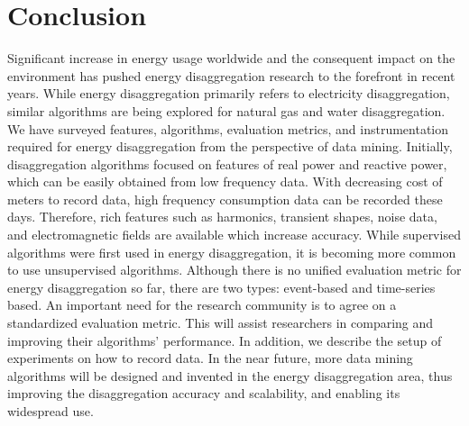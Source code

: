 \section{Conclusion}
\label{sec:conclusion}
Significant increase in energy usage worldwide and the consequent impact
on the environment has pushed energy disaggregation research to the
forefront in recent years. 
While energy disaggregation primarily refers to electricity disaggregation,
similar algorithms are being explored for natural gas and water disaggregation. 
We have surveyed features, algorithms, evaluation metrics, and 
instrumentation required for energy disaggregation 
from the perspective of data mining. 
Initially, disaggregation algorithms focused on features
of real power and reactive power, which 
can be easily obtained from low frequency data.
With decreasing cost of meters to record data,
high frequency consumption data can be recorded these days. 
Therefore, rich features such as harmonics, transient shapes, 
noise data, and electromagnetic fields are available which increase accuracy. 
While supervised algorithms were first used in energy disaggregation, 
it is becoming more common to use unsupervised algorithms.
Although there is no unified evaluation metric for energy disaggregation 
so far, there are two types: 
event-based and time-series based. An important need for the research community is to 
agree on a standardized evaluation metric. This will assist researchers in
comparing and improving
their algorithms' performance.
In addition, we describe the setup of experiments on 
how to record data.  
In the near future, 
more data mining algorithms will be designed and invented in the 
energy disaggregation area, thus improving the disaggregation accuracy and
scalability, and enabling its widespread use. 
